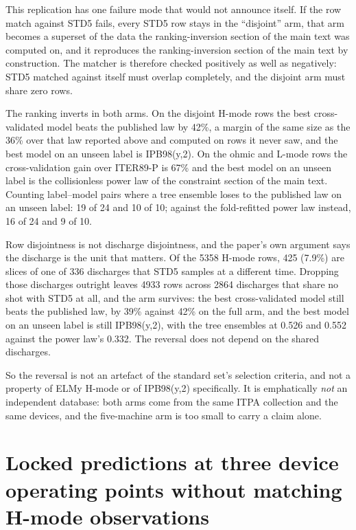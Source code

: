 \documentclass[12pt,letterpaper]{article}
\begin{document}
This replication has one failure mode that would not announce itself. If the
row match against STD5 fails, every STD5 row stays in the ``disjoint'' arm, that
arm becomes a superset of the data the ranking-inversion section of the main text was computed on, and
it reproduces the ranking-inversion section of the main text by construction. The matcher is therefore
checked positively as well as negatively: STD5 matched against itself must
overlap completely, and the disjoint arm must share zero rows.

The ranking inverts in both arms. On the disjoint H-mode rows the best
cross-validated model beats the published law by 42\%, a margin of the same
size as the 36\% over that law reported above and computed on rows it never
saw, and the best model on an unseen label is IPB98(y,2). On the ohmic and L-mode rows the
cross-validation gain over ITER89-P is 67\% and the best model on an unseen
label is the collisionless power law of the constraint section of the main text. Counting label--model pairs
where a tree ensemble loses to the published law on an unseen label: 19 of 24
and 10 of 10; against the fold-refitted power law instead, 16 of 24 and 9 of 10.

Row disjointness is not discharge disjointness, and the paper's own argument
says the discharge is the unit that matters. Of the 5358 H-mode rows, 425
(7.9\%) are slices of one of 336 discharges that STD5 samples at a different
time. Dropping those discharges outright leaves 4933 rows across 2864
discharges that share no shot with STD5 at all, and the arm survives: the best
cross-validated model still beats the published law, by 39\% against 42\% on the
full arm, and the best model on an unseen label is still IPB98(y,2), with the
tree ensembles at 0.526 and 0.552 against the power law's 0.332. The reversal
does not depend on the shared discharges.

So the reversal is not an artefact of the standard set's selection criteria, and
not a property of ELMy H-mode or of IPB98(y,2) specifically. It is emphatically
\emph{not} an independent database: both arms come from the same ITPA collection
and the same devices, and the five-machine arm is too small to carry a claim
alone.

\section{Locked predictions at three device operating points without matching
H-mode observations}
\label{supp:forecast}
\end{document}
